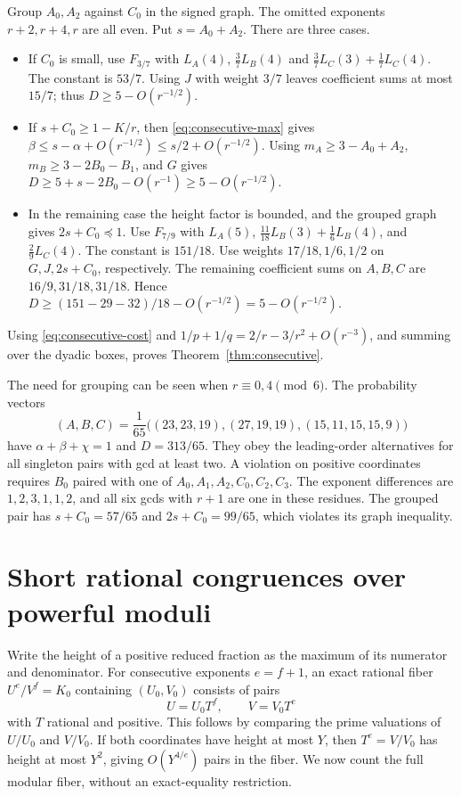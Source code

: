 \documentclass[11pt,reqno]{amsart}
\begin{document}
Group \(A_0,A_2\) against \(C_0\) in the signed graph. The omitted
exponents \(r+2,r+4,r\) are all even. Put \(s=A_0+A_2\).
There are three cases.
\begin{itemize}
\item If \(C_0\) is small, use \(F_{3/7}\) with \(L_A(4)\),
\(\frac37 L_B(4)\) and \(\frac37 L_C(3)+\frac17 L_C(4)\).
The constant is \(53/7\). Using \(J\) with weight \(3/7\)
leaves coefficient sums at most \(15/7\); thus
\(D\ge5-O(r^{-1/2})\).
\item If \(s+C_0\ge1-K/r\), then \eqref{eq:consecutive-max} gives
\(\beta\le s-\alpha+O(r^{-1/2})\le s/2+O(r^{-1/2})\).
Using \(m_A\ge3-A_0+A_2\), \(m_B\ge3-2B_0-B_1\), and \(G\)
gives \(D\ge5+s-2B_0-O(r^{-1})\ge5-O(r^{-1/2})\).
\item In the remaining case the height factor is bounded, and the
grouped graph gives \(2s+C_0\preceq 1\). Use \(F_{7/9}\)
with \(L_A(5)\), \(\frac{11}{18}L_B(3)+\frac16 L_B(4)\),
and \(\frac29 L_C(4)\). The constant is \(151/18\).
Use weights \(17/18,1/6,1/2\) on \(G,J,2s+C_0\), respectively.
The remaining coefficient sums on \(A,B,C\) are
\(16/9,31/18,31/18\). Hence
\(D\ge (151-29-32)/18-O(r^{-1/2})=5-O(r^{-1/2})\).
\end{itemize}

Using \eqref{eq:consecutive-cost} and
\(1/p+1/q=2/r-3/r^2+O(r^{-3})\), and summing over the dyadic boxes,
proves Theorem~\ref{thm:consecutive}.

The need for grouping can be seen when \(r\equiv0,4\pmod6\).
The probability vectors
\[
 (A,B,C)=\frac1{65}\bigl((23,23,19),(27,19,19),(15,11,15,15,9)\bigr)
\]
have \(\alpha+\beta+\chi=1\) and \(D=313/65\).
They obey the leading-order alternatives for all singleton pairs
with gcd at least two. A violation on positive coordinates
requires \(B_0\) paired with one of \(A_0,A_1,A_2,C_0,C_2,C_3\).
The exponent differences are \(1,2,3,1,1,2\), and all six
gcds with \(r+1\) are one in these residues. The grouped pair
has \(s+C_0=57/65\) and \(2s+C_0=99/65\), which violates
its graph inequality.

\section{Short rational congruences over powerful moduli}
Write the height of a positive reduced fraction as the maximum
of its numerator and denominator. For consecutive exponents
\(e=f+1\), an exact rational fiber \(U^e/V^f=K_0\) containing
\((U_0,V_0)\) consists of pairs
\[
                         U=U_0 T^f,\qquad V=V_0 T^e
\]
with \(T\) rational and positive. This follows by comparing the
prime valuations of \(U/U_0\) and \(V/V_0\). If both coordinates
have height at most \(Y\), then \(T^e=V/V_0\) has height at most
\(Y^2\), giving \(O(Y^{4/e})\) pairs in the fiber. We now count
the full modular fiber, without an exact-equality restriction.
\end{document}
